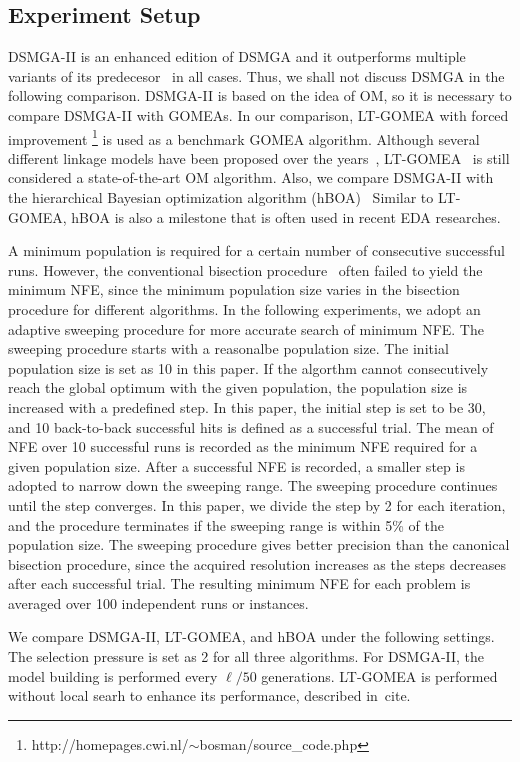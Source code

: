 \documentclass{sig-alternate-05-2015}
\begin{document}
\subsection{Experiment Setup}
DSMGA-II is an enhanced edition of DSMGA and it outperforms multiple variants of its predecesor~\cite{yu:DSMGA} in all cases. 
Thus, we shall not discuss DSMGA in the following comparison.
DSMGA-II is based on the idea of OM, so it is necessary to compare DSMGA-II with GOMEAs. 
In our comparison, LT-GOMEA with forced improvement \footnote{http://homepages.cwi.nl/$\sim$bosman/source\_code.php} is used as a benchmark GOMEA algorithm.
Although several different linkage models have been proposed over the years~\cite{bosman:robust}, LT-GOMEA~\cite{bosman:LT-GOMEA} is still considered a state-of-the-art OM algorithm.
Also, we compare DSMGA-II with the hierarchical Bayesian optimization algorithm (hBOA)~\cite{pelikan:hBOA}
Similar to LT-GOMEA, hBOA is also a milestone that is often used in recent EDA researches.


A minimum population is required for a certain number of consecutive successful runs.
However, the conventional bisection procedure~\cite{} often failed to yield the minimum NFE, since the minimum population size varies in the bisection procedure for different algorithms.
In the following experiments, we adopt an adaptive sweeping procedure for more accurate search of minimum NFE.
The sweeping procedure starts with a reasonalbe population size.
The initial population size is set as 10 in this paper.
If the algorthm cannot consecutively reach the global optimum with the given population, the population size is increased with a predefined step.
In this paper, the initial step is set to be 30, and 10 back-to-back successful hits is defined as a successful trial.
The mean of NFE over 10 successful runs is recorded as the minimum NFE required for a given population size.
After a successful NFE is recorded, a smaller step is adopted to narrow down the sweeping range.
The sweeping procedure continues until the step converges.
In this paper, we divide the step by 2 for each iteration, and the procedure terminates if the sweeping range is within 5\% of the population size.
The sweeping procedure gives better precision than the canonical bisection procedure, since the acquired resolution increases as the steps decreases after each successful trial.
The resulting minimum NFE for each problem is averaged over 100 independent runs or instances.

We compare DSMGA-II, LT-GOMEA, and hBOA under the following settings. The selection pressure is set as 2 for all three algorithms. 
For DSMGA-II, the model building is performed every $\ell/50$ generations.
LT-GOMEA is performed without local searh to enhance its performance, described in~cite{}.
\end{document}
